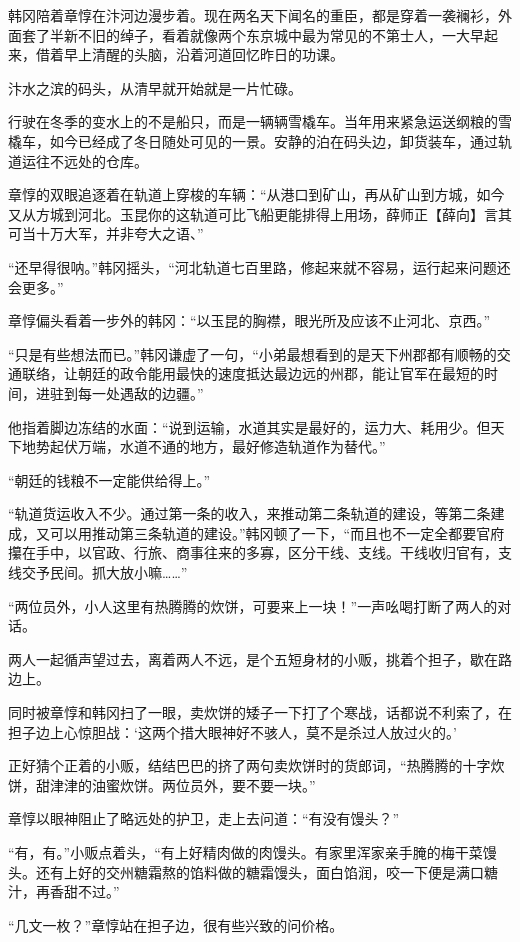 韩冈陪着章惇在汴河边漫步着。现在两名天下闻名的重臣，都是穿着一袭襕衫，外面套了半新不旧的绰子，看着就像两个东京城中最为常见的不第士人，一大早起来，借着早上清醒的头脑，沿着河道回忆昨日的功课。

汴水之滨的码头，从清早就开始就是一片忙碌。

行驶在冬季的变水上的不是船只，而是一辆辆雪橇车。当年用来紧急运送纲粮的雪橇车，如今已经成了冬日随处可见的一景。安静的泊在码头边，卸货装车，通过轨道运往不远处的仓库。

章惇的双眼追逐着在轨道上穿梭的车辆：“从港口到矿山，再从矿山到方城，如今又从方城到河北。玉昆你的这轨道可比飞船更能排得上用场，薛师正【薛向】言其可当十万大军，并非夸大之语、”

“还早得很呐。”韩冈摇头，“河北轨道七百里路，修起来就不容易，运行起来问题还会更多。”

章惇偏头看着一步外的韩冈：“以玉昆的胸襟，眼光所及应该不止河北、京西。”

“只是有些想法而已。”韩冈谦虚了一句，“小弟最想看到的是天下州郡都有顺畅的交通联络，让朝廷的政令能用最快的速度抵达最边远的州郡，能让官军在最短的时间，进驻到每一处遇敌的边疆。”

他指着脚边冻结的水面：“说到运输，水道其实是最好的，运力大、耗用少。但天下地势起伏万端，水道不通的地方，最好修造轨道作为替代。”

“朝廷的钱粮不一定能供给得上。”

“轨道货运收入不少。通过第一条的收入，来推动第二条轨道的建设，等第二条建成，又可以用推动第三条轨道的建设。”韩冈顿了一下，“而且也不一定全都要官府攥在手中，以官政、行旅、商事往来的多寡，区分干线、支线。干线收归官有，支线交予民间。抓大放小嘛……”

“两位员外，小人这里有热腾腾的炊饼，可要来上一块！”一声吆喝打断了两人的对话。

两人一起循声望过去，离着两人不远，是个五短身材的小贩，挑着个担子，歇在路边上。

同时被章惇和韩冈扫了一眼，卖炊饼的矮子一下打了个寒战，话都说不利索了，在担子边上心惊胆战：‘这两个措大眼神好不骇人，莫不是杀过人放过火的。’

正好猜个正着的小贩，结结巴巴的挤了两句卖炊饼时的货郎词，“热腾腾的十字炊饼，甜津津的油蜜炊饼。两位员外，要不要一块。”

章惇以眼神阻止了略远处的护卫，走上去问道：“有没有馒头？”

“有，有。”小贩点着头，“有上好精肉做的肉馒头。有家里浑家亲手腌的梅干菜馒头。还有上好的交州糖霜熬的馅料做的糖霜馒头，面白馅润，咬一下便是满口糖汁，再香甜不过。”

“几文一枚？”章惇站在担子边，很有些兴致的问价格。

